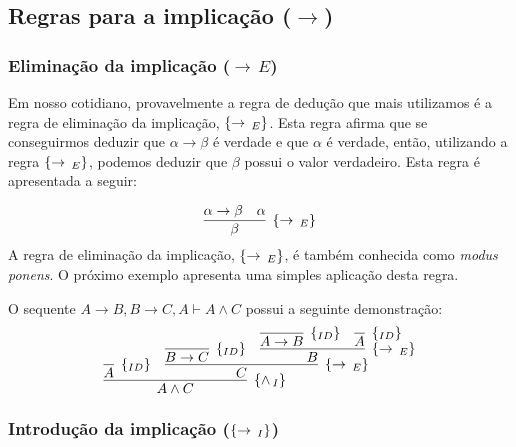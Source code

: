 \subsection{Regras para a implica\c{c}\~ao ($\to$)}

\subsubsection{Elimina\c{c}\~ao da implica\c{c}\~ao ($\to\,E$)}

Em nosso cotidiano, provavelmente a regra de dedu\c{c}\~ao que mais
utilizamos \'e a regra de elimina\c{c}\~ao da implica\c{c}\~ao,
$\scriptsize{\{\to\,_E\}}$. Esta regra afirma que se conseguirmos deduzir que $\alpha \to
\beta$ \'e verdade e que $\alpha$ \'e verdade, ent\~ao, utilizando a
regra $\scriptsize{\{\to\,_E\}}$, podemos deduzir que $\beta$ possui o valor
verdadeiro. Esta regra \'e apresentada a seguir:

\[
    \infer[\impE]{\beta}
                        {\alpha \to \beta & \alpha}
\]
A regra de elimina\c{c}\~ao da implica\c{c}\~ao, $\scriptsize{\{\to\,_E\}}$, \'e tamb\'em
conhecida como \textit{modus ponens}.
O pr\'oximo exemplo apresenta uma simples aplica\c{c}\~ao desta
regra.
\begin{Example}
  O sequente $A \to B, B\to C, A \vdash A \land C$ possui a seguinte
  demonstra\c{c}\~ao:
  \[
       \infer[\andI]{A \land C}
                          {
                            \infer[\Id]{A}{}
                            &
                            \infer[\impE]{C}
                                     {
                                       \infer[\Id]{B\to C}
                                                      {}
                                        &
                                        \infer[\impE]{B}
                                                            {
                                                              \infer[\Id]{A
                                                              \to B}{}
                                                              &
                                                              \infer[\Id]{A}{}
                                                            }
                                     }
                          }
  \]
\end{Example}

\subsubsection{Introdu\c{c}\~ao da implica\c{c}\~ao ($\scriptsize{\{\to\,_I\}}$)}

